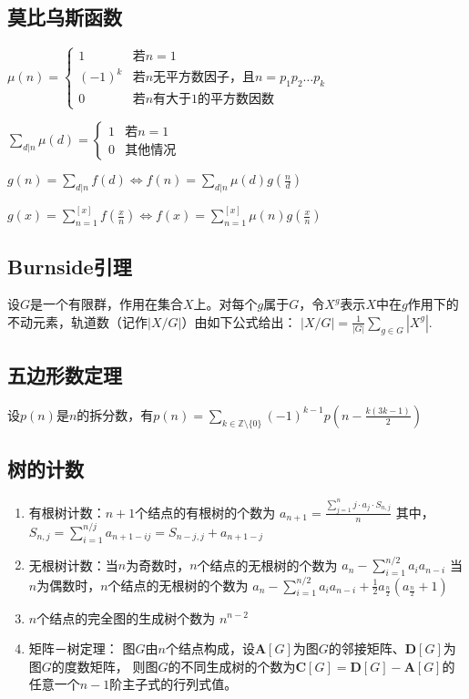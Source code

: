 	\subsection{莫比乌斯函数}
		$\mu(n) = \begin{cases}
			1 & \text{若}n=1\\
			(-1)^k & \text{若}n\text{无平方数因子，且}n = p_1p_2\dots p_k\\
			0 & \text{若}n\text{有大于}1\text{的平方数因数}
		\end{cases}$
		\par
		$\sum_{d|n}{\mu(d)} = \begin{cases}
			1 & \text{若}n=1\\
			0 & \text{其他情况}
		\end{cases}$
		\par
		$g(n) = \sum_{d|n}{f(d)} \Leftrightarrow f(n) = \sum_{d|n}{\mu(d)g(\frac{n}{d})}$\par
		$g(x) = \sum_{n=1}^{[x]}f(\frac{x}{n}) \Leftrightarrow f(x) = \sum_{n=1}^{[x]}{\mu(n)g(\frac{x}{n})}$
	\subsection{Burnside引理}
		设$G$是一个有限群，作用在集合$X$上。对每个$g$属于$G$，令$X^g$表示$X$中在$g$作用下的不动元素，轨道数（记作$|X/G|$）由如下公式给出：
			$|X/G| = \frac{1}{|G|}\sum_{g \in G}|X^g|.\,$
	\subsection{五边形数定理}
		设$p(n)$是$n$的拆分数，有$p(n) = \sum_{k \in \mathbb{Z} \setminus \{0\}} (-1)^{k - 1} p\left(n - \frac{k(3k - 1)}{2}\right)$
	\subsection{树的计数}
		\begin{enumerate}\setlength{\itemsep}{-\itemsep}
			\item 有根树计数：$n+1$个结点的有根树的个数为
				$a_{n+1} = \frac{\sum_{j=1}^{n}{j \cdot a_j \cdot{S_{n, j}}}}{n}$
			其中，
				$S_{n, j} = \sum_{i=1}^{n/j}{a_{n+1-ij}} = S_{n-j, j} + a_{n+1-j}$
			\item 无根树计数：当$n$为奇数时，$n$个结点的无根树的个数为
				$a_n-\sum_{i=1}^{n/2}{a_ia_{n-i}}$
			当$n$为偶数时，$n$个结点的无根树的个数为
				$a_n-\sum_{i=1}^{n/2}{a_ia_{n-i}}+\frac{1}{2}a_{\frac{n}{2}}(a_{\frac{n}{2}}+1)$
			\item $n$个结点的完全图的生成树个数为
				$n^{n-2}$
			\item 矩阵－树定理：
			图$G$由$n$个结点构成，设$\bm{A}[G]$为图$G$的邻接矩阵、$\bm{D}[G]$为图$G$的度数矩阵，
			则图$G$的不同生成树的个数为$\bm{C}[G] = \bm{D}[G] - \bm{A}[G]$的任意一个$n-1$阶主子式的行列式值。
		\end{enumerate}
